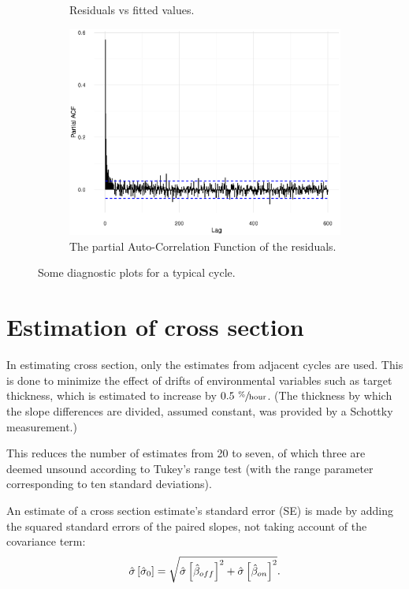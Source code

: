 \documentclass[reprint]{revtex4-1}
\newcommand{\scl}{.43}
\begin{document}
\begin{figure}
\begin{subfigure}{.5\textwidth}
\caption{Residuals vs fitted values.}
\end{subfigure}
\begin{subfigure}{.5\textwidth}
\includegraphics[scale=\scl]{img/Run969_residual_PACF.eps}
\caption{The partial Auto-Correlation Function of the residuals.}
\end{subfigure}
\caption{Some diagnostic plots for a typical cycle.\label{fig:Run969}}
\end{figure}

\section{Estimation of cross section}

In estimating cross section, only the estimates from adjacent cycles are used. This is done to minimize the effect of drifts of environmental variables such as target thickness, which is estimated to increase by $0.5~ \sfrac{\%}{\mathrm{hour}}$. (The thickness by which the slope differences are divided, assumed constant, was provided by a Schottky measurement.)

This reduces the number of estimates from 20 to seven, of which three are deemed unsound according to Tukey's range test (with the range parameter corresponding to ten standard deviations). 

An estimate of a cross section estimate's standard error (SE) is made by adding the squared standard errors of the paired slopes, not taking account of the covariance term:
\begin{equation}
	\SE*{\CS*[0]} = \sqrt{\SE*{\slp*[off]}^2 + \SE*{\slp*[on]}^2}.
\end{equation}
\end{document}
